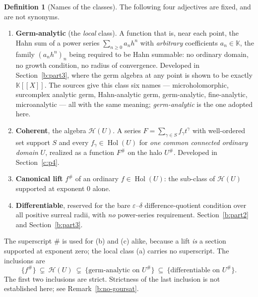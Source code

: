 \documentclass[11pt,a4paper]{article}
\numberwithin{equation}{section}
\theoremstyle{definition}
\newtheorem{definition}[theorem]{Definition}
\theoremstyle{remark}
\theoremstyle{plain}
\newcommand{\K}{\mathbb K}
\DeclareMathOperator{\Hol}{Hol}
\newcommand{\tm}{t}
\newcommand{\halo}[1]{#1^{\#}}
\newcommand{\ev}[1]{#1^{\#}}
\newcommand{\Hc}{\mathcal H}
\begin{document}
\begin{definition}[Names of the classes]\label{a:def:classnames}
The following four adjectives are fixed, and are not synonyms.
\begin{enumerate}[label=\textup{(\alph*)},leftmargin=2.2em]
\item \textbf{Germ-analytic} (the \emph{local} class).  A function that
is, near each point, the Hahn sum of a power series
$\sum_{n\ge0}a_n h^{n}$ with \emph{arbitrary} coefficients
$a_n\in\K$, the family $(a_nh^{n})_n$ being required to be Hahn
summable: no ordinary domain, no growth condition, no radius of
convergence.  Developed in Section~\ref{b:part3}, where the germ algebra at any point
is shown to be exactly $\K[[X]]$.  The sources give this class six
names --- microholomorphic, surcomplex analytic germ, Hahn-analytic
germ, germ-analytic, fine-analytic, microanalytic --- all with the same
meaning; \emph{germ-analytic} is the one adopted here.
\item \textbf{Coherent}, the algebra $\Hc(U)$.  A series
$F=\sum_{\gamma\in S}f_\gamma \tm^{\gamma}$ with well-ordered set
support $S$ and every $f_\gamma\in\Hol(U)$ for \emph{one common
connected ordinary domain} $U$, realized as a function $\ev F$ on the
halo $\halo U$.  Developed in Section~\ref{c:p4}.
\item \textbf{Canonical lift} $\ev f$ of an ordinary $f\in\Hol(U)$: the
sub-class of $\Hc(U)$ supported at exponent $0$ alone.
\item \textbf{Differentiable}, reserved for the bare $\varepsilon$--$\delta$
difference-quotient condition over all positive surreal radii, with
\emph{no} power-series requirement.  Section~\ref{b:part2} and Section~\ref{b:part3}.
\end{enumerate}
The superscript $\#$ is used for (b) and (c) alike, because a lift
\emph{is} a section supported at exponent zero; the local class (a)
carries no superscript.  The inclusions are
\[
 \{\ev f\}\ \subsetneq\ \Hc(U)\ \subsetneq\
 \bigl\{\text{germ-analytic on }\halo U\bigr\}\ \subseteq\
 \bigl\{\text{differentiable on }\halo U\bigr\}.
\]
The first two inclusions are strict. Strictness of the last inclusion is
not established here; see Remark~\ref{b:no-goursat}.
\end{definition}
\end{document}
